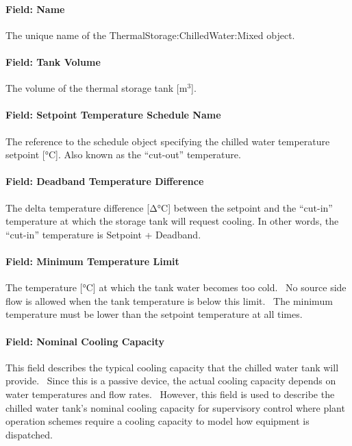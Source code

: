 \paragraph{Field: Name}\label{field-name-22-001}

The unique name of the ThermalStorage:ChilledWater:Mixed object.

\paragraph{Field: Tank Volume}\label{field-tank-volume}

The volume of the thermal storage tank {[}m\(^{3}\){]}.

\paragraph{Field: Setpoint Temperature Schedule Name}\label{field-setpoint-temperature-schedule-name-000}

The reference to the schedule object specifying the chilled water temperature setpoint {[}°C{]}. Also known as the ``cut-out'' temperature.

\paragraph{Field: Deadband Temperature Difference}\label{field-deadband-temperature-difference}

The delta temperature difference {[}Δ°C{]} between the setpoint and the ``cut-in'' temperature at which the storage tank will request cooling. In other words, the ``cut-in'' temperature is Setpoint + Deadband.

\paragraph{Field: Minimum Temperature Limit}\label{field-minimum-temperature-limit}

The temperature {[}°C{]} at which the tank water becomes too cold.~ No source side flow is allowed when the tank temperature is below this limit.~ The minimum temperature must be lower than the setpoint temperature at all times.

\paragraph{Field: Nominal Cooling Capacity}\label{field-nominal-cooling-capacity-2}

This field describes the typical cooling capacity that the chilled water tank will provide.~ Since this is a passive device, the actual cooling capacity depends on water temperatures and flow rates.~ However, this field is used to describe the chilled water tank's nominal cooling capacity for supervisory control where plant operation schemes require a cooling capacity to model how equipment is dispatched.

